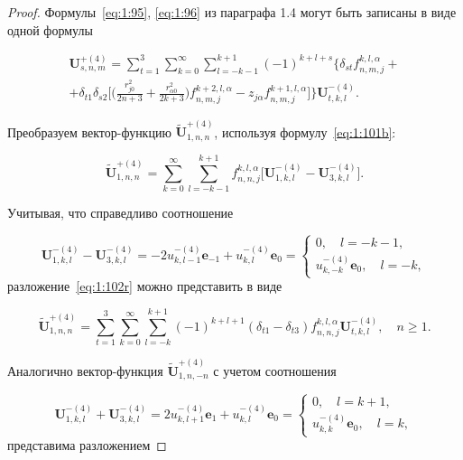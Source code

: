 \begin{proof}
Формулы~\eqref{eq:1:95}, \eqref{eq:1:96} из параграфа 1.4 могут быть записаны в виде одной формулы

\begin{multline}\label{eq:1:101b}
\mathbf{U}_{s,n,m}^{+(4)}=\sum\limits_{t=1}^3\sum\limits_{k=0}^\infty\sum\limits_{l=-k-1}^{k+1}(-1)^{k+l+s}\bigg\{\delta_{st}f_{n,m,j}^{k,l,\alpha}+ \\
+\delta_{t1}\delta_{s2}\bigg[\bigg(\frac{r_{j0}^2}{2n+3}+\frac{r_{\alpha 0}^2}{2k+3}\bigg){f}_{n,m,j}^{k+2,l,\alpha}-z_{j\alpha}{f}_{n,m,j}^{k+1,l,\alpha}\bigg]\bigg\}\mathbf{U}_{t,k,l}^{-(4)}.
\end{multline}

Преобразуем вектор-функцию $\mathbf{\tilde U}_{1,n,n}^{+(4)}$, используя формулу~\eqref{eq:1:101b}:

\begin{equation}
\mathbf{\tilde U}_{1,n,n}^{+(4)}=\sum\limits_{k=0}^\infty\sum\limits_{l=-k-1}^{k+1}{f}_{n,n,j}^{k,l,\alpha}\bigg[\mathbf{U}_{1,k,l}^{-(4)}-\mathbf{U}_{3,k,l}^{-(4)}\bigg].
\label{eq:1:102r}
\end{equation}

\noindent Учитывая, что справедливо соотношение

\begin{equation*}
\mathbf{U}_{1,k,l}^{-(4)}-\mathbf{U}_{3,k,l}^{-(4)}=-2u_{k,l-1}^{-(4)}\mathbf{e}_{-1}+
u_{k,l}^{-(4)}\mathbf{e}_0=
\begin{cases}
0,\quad l=-k-1, \\
u_{k,-k}^{-(4)}\mathbf{e}_0,\quad l=-k,
\end{cases}
\end{equation*}
разложение~\eqref{eq:1:102r} можно представить в виде

\begin{equation}
\mathbf{\tilde U}_{1,n,n}^{+(4)}=\sum\limits_{t=1}^3\sum\limits_{k=0}^\infty\sum\limits_{l=-k}^{k+1}(-1)^{k+l+1}(\delta_{t1}-\delta_{t3}){f}_{n,n,j}^{k,l,\alpha}\mathbf{U}_{t,k,l}^{-(4)},\quad n\ge 1.
\label{eq:1:103r}
\end{equation}

Аналогично вектор-функция $\mathbf{\tilde U}_{1,n,-n}^{+(4)}$ с учетом соотношения

\begin{equation*}
\mathbf{U}_{1,k,l}^{-(4)}+\mathbf{U}_{3,k,l}^{-(4)}=2u_{k,l+1}^{-(4)}\mathbf{e}_{1}+
u_{k,l}^{-(4)}\mathbf{e}_0=
\begin{cases}
0,\quad l=k+1, \\
u_{k,k}^{-(4)}\mathbf{e}_0,\quad l=k,
\end{cases}
\end{equation*}
представима разложением


\end{proof}
